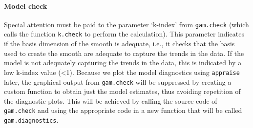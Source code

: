 \documentclass[
]{article}
\newcommand{\passthrough}[1]{#1}
\begin{document}
\hypertarget{gam-00-model-check}{%
\paragraph{Model check}\label{gam-00-model-check}}

Special attention must be paid to the parameter `k-index' from \passthrough{\lstinline!gam.check!} (which calls the function \passthrough{\lstinline!k.check!} to perform the calculation). This parameter indicates if the basis dimension of the smooth is adequate, i.e., it checks that the basis used to create the smooth are adequate to capture the trends in the data. If the model is not adequately capturing the trends in the data, this is indicated by a low k-index value (\textless1). Because we plot the model diagnostics using \passthrough{\lstinline!appraise!} later, the graphical output from \passthrough{\lstinline!gam.check!} will be suppressed by creating a custom function to obtain just the model estimates, thus avoiding repetition of the diagnostic plots. This will be achieved by calling the source code of \passthrough{\lstinline!gam.check!} and using the appropriate code in a new function that will be called \passthrough{\lstinline!gam.diagnostics!}.
\end{document}
